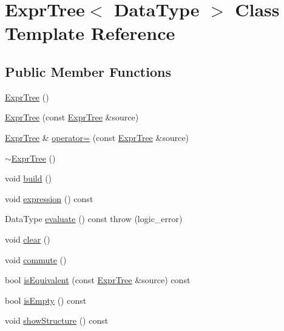 \hypertarget{class_expr_tree}{\section{Expr\+Tree$<$ Data\+Type $>$ Class Template Reference}
\label{class_expr_tree}
}
\subsection*{Public Member Functions}
\begin{DoxyCompactItemize}
\item 
\hyperlink{class_expr_tree_a1d5004443b461637bcb0fe0a86759d50}{Expr\+Tree} ()
\item 
\hyperlink{class_expr_tree_aeec9dc6139cf32fcc911840bab438239}{Expr\+Tree} (const \hyperlink{class_expr_tree}{Expr\+Tree} \&source)
\item 
\hyperlink{class_expr_tree}{Expr\+Tree} \& \hyperlink{class_expr_tree_a9a7b2120af2c2df666b1154eec20008a}{operator=} (const \hyperlink{class_expr_tree}{Expr\+Tree} \&source)
\item 
\hyperlink{class_expr_tree_a8976e9af7e1209b9db475b863ab9f31d}{$\sim$\+Expr\+Tree} ()
\item 
void \hyperlink{class_expr_tree_a283a61049eb163f6f370d562cc92c824}{build} ()
\item 
void \hyperlink{class_expr_tree_ac367645dc4ccaf488e121cd5a0a8c07d}{expression} () const 
\item 
Data\+Type \hyperlink{class_expr_tree_ad1579e64d55cdfcd500a634ef69ed792}{evaluate} () const   throw (logic\+\_\+error)
\item 
void \hyperlink{class_expr_tree_a87d6593a3ad6199b5521f6d1e3ba851f}{clear} ()
\item 
void \hyperlink{class_expr_tree_a8bfcf0da6dfd93f4228a35cded704fb4}{commute} ()
\item 
bool \hyperlink{class_expr_tree_ae64a4e3b5008fa2f533fd7461ead2485}{is\+Equivalent} (const \hyperlink{class_expr_tree}{Expr\+Tree} \&source) const 
\item 
bool \hyperlink{class_expr_tree_a3b534db1ad9bf8fefadb20bd1161c96b}{is\+Empty} () const 
\item 
void \hyperlink{class_expr_tree_a6f4c5e2ae8224fb53fb893231814e6d9}{show\+Structure} () const 
\end{DoxyCompactItemize}


